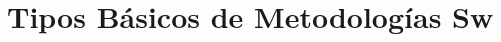 \documentclass[a4paper,t]{beamer}
\begin{document}
%

\section{Tipos Básicos de Metodologías Sw}
%
%
%
\end{document}
